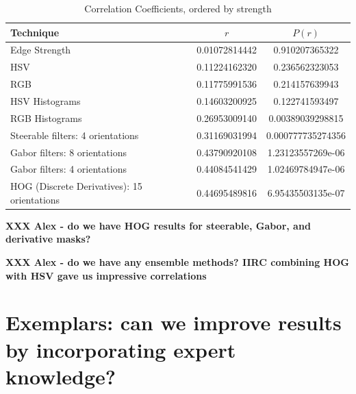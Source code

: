 \documentclass[conference,a4paper]{IEEEtran}
\begin{document}
\begin{table}[h]
\centering
\begin{tabular}{|p{3.5cm}|c|c|}
\hline
Technique     & $r$ & $P(r)$ \\ \hline
Edge Strength					& 0.01072814442	& 0.910207365322    \\
HSV						& 0.11224162320	& 0.236562323053    \\
RGB						& 0.11775991536	& 0.214157639943    \\
HSV Histograms					& 0.14603200925	& 0.122741593497    \\
RGB Histograms					& 0.26953009140	& 0.00389039298815  \\
Steerable filters: 4 orientations		& 0.31169031994	& 0.000777735274356 \\
Gabor filters: 8 orientations			& 0.43790920108	& 1.23123557269e-06 \\
Gabor filters: 4 orientations			& 0.44084541429	& 1.02469784947e-06 \\
HOG (Discrete Derivatives): 15 orientations	& 0.44695489816	& 6.95435503135e-07 \\

\hline
\end{tabular}
\vspace{0.5em}
\caption{Correlation Coefficients, ordered by strength}\label{tab:results}
\end{table}

\textbf{XXX Alex - do we have HOG results for steerable, Gabor, and derivative masks?}

\textbf{XXX Alex - do we have any ensemble methods? IIRC combining HOG with HSV gave us impressive correlations}

\section{Exemplars: can we improve results by incorporating expert knowledge? }
\end{document}
